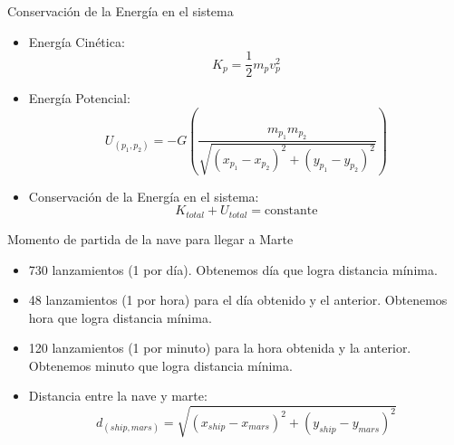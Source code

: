\documentclass{beamer}
\begin{document}
            \begin{frame}{Conservación de la Energía en el sistema}
                \begin{itemize}
                    \item Energía Cinética:
                    \begin{equation*}
                        K_{p} = \frac{1}{2} m_{p} v_{p}^2
                    \end{equation*}
                    \item Energía Potencial:
                    \begin{equation*}
                        U_{(p_1,p_2)} = - G \left( \frac{m_{p_1} m_{p_2}}{\sqrt{(x_{p_1} - x_{p_2})^2 + (y_{p_1} - y_{p_2})^2}} \right)
                    \end{equation*}
                    \item Conservación de la Energía en el sistema:
                    \begin{equation*}
                        K_{total} + U_{total} = \text{constante}
                    \end{equation*}
                \end{itemize}
            \end{frame}

            \begin{frame}{Momento de partida de la nave para llegar a Marte}
                \begin{itemize}
                    \item 730 lanzamientos (1 por día). Obtenemos día que logra distancia mínima.
                    \item 48 lanzamientos (1 por hora) para el día obtenido y el anterior. Obtenemos hora que logra distancia mínima.
                    \item 120 lanzamientos (1 por minuto) para la hora obtenida y la anterior. Obtenemos minuto que logra distancia mínima.
                    \item Distancia entre la nave y marte:
                    \begin{equation*}
                        d_{(ship, mars)} = \sqrt{(x_{ship} - x_{mars})^2 + (y_{ship} - y_{mars})^2}
                    \end{equation*}
                \end{itemize}
            \end{frame}
\end{document}
